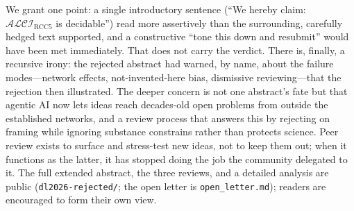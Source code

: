 \documentclass[11pt]{article}
\newcommand{\ALCIRCC}[1]{\mathcal{ALCI}_{\mathrm{RCC#1}}}
\theoremstyle{plain}
\theoremstyle{definition}
\begin{document}
We grant one point: a single introductory sentence (``We hereby claim:
$\ALCIRCC{5}$ is decidable'') read more assertively than the surrounding,
carefully hedged text supported, and a constructive ``tone this down and
resubmit'' would have been met immediately. That does not carry the
verdict. There is, finally, a recursive irony: the rejected abstract had
warned, by name, about the failure modes---network effects,
not-invented-here bias, dismissive reviewing---that the rejection then
illustrated. The deeper concern is not one abstract's fate but that
agentic AI now lets ideas reach decades-old open problems from outside the
established networks, and a review process that answers this by rejecting
on framing while ignoring substance constrains rather than protects
science. Peer review exists to surface and stress-test new ideas, not to
keep them out; when it functions as the latter, it has stopped doing the
job the community delegated to it. The full extended abstract, the three
reviews, and a detailed analysis are public (\texttt{dl2026-rejected/};
the open letter is \texttt{open\_letter.md}); readers are encouraged to
form their own view.
\end{document}
